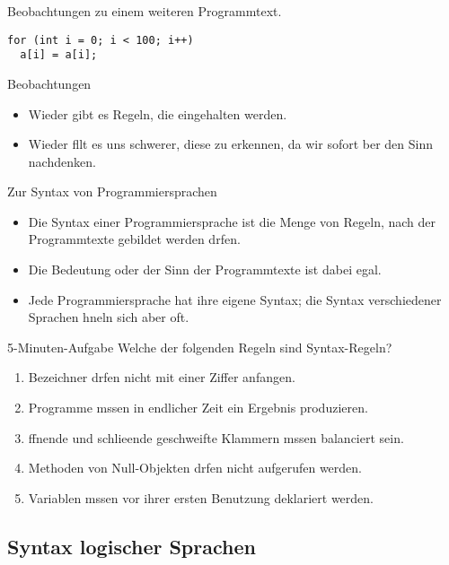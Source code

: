\begin{frame}[fragile]{Beobachtungen zu einem weiteren Programmtext.}
  
\begin{verbatim}
for (int i = 0; i < 100; i++)
  a[i] = a[i];
\end{verbatim}
  \begin{block}{Beobachtungen}
    \begin{itemize}
    \item Wieder gibt es Regeln, die eingehalten werden.
    \item Wieder fllt es uns \alert{schwerer}, diese zu erkennen, da
      wir \alert{sofort ber den Sinn nachdenken}.
    \end{itemize}
  \end{block}
\end{frame}


\begin{frame}{Zur Syntax von Programmiersprachen}
  \begin{itemize}
  \item Die \alert{Syntax} einer Programmiersprache ist die
    \alert{Menge von Regeln}, nach der Programmtexte gebildet werden 
    drfen.
  \item Die \alert{Bedeutung} oder der \alert{Sinn} der Programmtexte
    ist dabei egal.
  \item
    Jede Programmiersprache hat ihre eigene Syntax; die Syntax
    verschiedener Sprachen hneln sich aber oft.
  \end{itemize}  
\end{frame}

\begin{frame}{5-Minuten-Aufgabe}
  Welche der folgenden Regeln sind Syntax-Regeln?
  \begin{enumerate}
  \item Bezeichner drfen nicht mit einer Ziffer anfangen.
  \item Programme mssen in endlicher Zeit ein Ergebnis produzieren.
  \item ffnende und schlieende geschweifte Klammern  mssen
    balanciert sein. 
  \item Methoden von Null-Objekten drfen nicht aufgerufen werden.
  \item Variablen mssen vor ihrer ersten Benutzung deklariert werden.
  \end{enumerate}  
\end{frame}


\subsection[Syntax\protect\\ logischer Sprachen]{Syntax logischer Sprachen}

